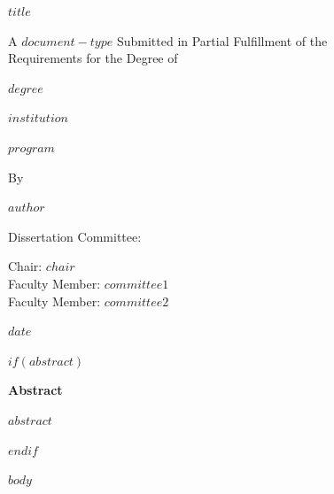 \documentclass[12pt,letterpaper]{article}
\begin{document}
\begin{titlepage}
\thispagestyle{empty}
\singlespacing
\centering
\vspace*{1cm}

{\LARGE\bfseries $title$\par}

\vspace{1.5cm}

A $document-type$ Submitted in Partial Fulfillment of the\\
Requirements for the Degree of\\[0.3cm]
{\large $degree$\par}

\vspace{1cm}

{\large $institution$\par}
{\normalsize $program$\par}

\vspace{1.5cm}

{\large By\par}
\vspace{0.3cm}
{\Large\bfseries $author$\par}

\vspace{1.5cm}

{\large Dissertation Committee:\par}
\vspace{0.3cm}
Chair: $chair$\\
Faculty Member: $committee1$\\
Faculty Member: $committee2$

\vfill

{\large $date$\par}
\end{titlepage}

$if(abstract)$
\newpage
\thispagestyle{empty}

\begin{center}
{\Large\bfseries Abstract}
\end{center}

\vspace{1cm}
\doublespacing

$abstract$

$endif$

\newpage
\tableofcontents

\newpage
\listoftables

\newpage
\listoffigures

\newpage

$body$
\end{document}
